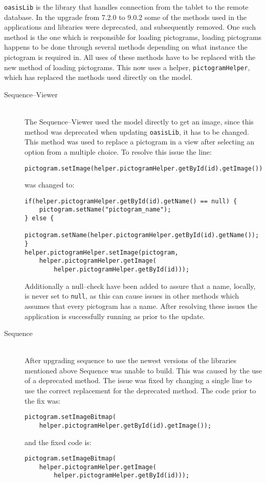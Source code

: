 \texttt{oasisLib} is the library that handles connection from the tablet to the remote database.
In the upgrade from 7.2.0 to 9.0.2 some of the methods used in the applications and libraries were deprecated, and subsequently removed.
One such method is the one which is responsible for loading pictograms, loading pictograms happens to be done through several methods depending on what instance the pictogram is required in.
All uses of these methods have to be replaced with the new method of loading pictograms.
This now uses a helper, \texttt{pictogramHelper}, which has replaced the methods used directly on the model.

\begin{description}
    \item[Sequence--Viewer] \hfill \\
    The Sequence--Viewer used the model directly to get an image, since this method was deprecated when updating \texttt{oasisLib}, it has to be changed.
    This method was used to replace a pictogram in a view after selecting an option from a multiple choice.
    To resolve this issue the line:
\begin{lstlisting}[frame=l]
pictogram.setImage(helper.pictogramHelper.getById(id).getImage());
\end{lstlisting}
was changed to:
\begin{lstlisting}[frame=l]
if(helper.pictogramHelper.getById(id).getName() == null) {
    pictogram.setName("pictogram_name");
} else {
    pictogram.setName(helper.pictogramHelper.getById(id).getName());
}
helper.pictogramHelper.setImage(pictogram,
    helper.pictogramHelper.getImage(
        helper.pictogramHelper.getById(id)));
\end{lstlisting}

    Additionally a null--check have been added to assure that a name, locally, is never set to \texttt{null}, as this can cause issues in other methods which assumes that every pictogram has a name.
    After resolving these issues the application is successfully running as prior to the update.

    \item[Sequence] \hfill \\
    After upgrading sequence to use the newest versions of the libraries mentioned above Sequence was unable to build.
    This was caused by the use of a deprecated method.
    The issue was fixed by changing a single line to use the correct replacement for the deprecated method.
    The code prior to the fix was:
\begin{lstlisting}[frame=l]
pictogram.setImageBitmap(
    helper.pictogramHelper.getById(id).getImage());
\end{lstlisting}
    and the fixed code is:
\begin{lstlisting}[frame=l]
pictogram.setImageBitmap(
    helper.pictogramHelper.getImage(
        helper.pictogramHelper.getById(id)));
\end{lstlisting}


\end{description}
